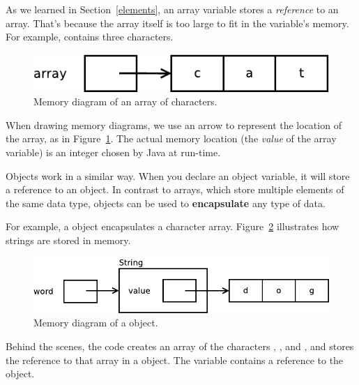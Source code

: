 
As we learned in Section~\ref{elements}, an array variable stores a {\em reference} to an array.
That's because the array itself is too large to fit in the variable's memory.
For example,  contains three characters.

\begin{figure}[!ht]
\begin{center}
\includegraphics[scale=0.85]{figs/mem2.pdf}
\caption{Memory diagram of an array of characters.}
\label{fig.mem2}
\end{center}
\end{figure}

When drawing memory diagrams, we use an arrow to represent the location of the array, as in Figure~\ref{fig.mem2}.
The actual memory location (the {\em value} of the array variable) is an integer chosen by Java at run-time.

Objects work in a similar way.
When you declare an object variable, it will store a reference to an object.
In contrast to arrays, which store multiple elements of the same data type, objects can be used to {\bf encapsulate} any type of data.

For example, a  object encapsulates a character array.
Figure~\ref{fig.mem3} illustrates how strings are stored in memory.

\begin{figure}[!ht]
\begin{center}
\includegraphics[scale=0.85]{figs/mem3.pdf}
\caption{Memory diagram of a  object.}
\label{fig.mem3}
\end{center}
\end{figure}

Behind the scenes, the code  creates an array of the characters , , and , and stores the reference to that array in a  object.
The variable  contains a reference to the  object.

